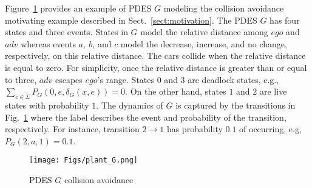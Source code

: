 \begin{example}  
Figure~\ref{fig:plant_G} provides an example of PDES $G$ modeling the collision avoidance motivating example described in Sect.~\ref{sect:motivation}.
The PDES $G$ has four states and three events.
States in $G$ model the relative distance among $ego$ and $adv$ whereas events $a,\ b$, and $c$ model the decrease, increase, and no change, respectively, on this relative distance.
The cars collide when the relative distance is equal to zero.
For simplicity, once the relative distance is greater than or equal to three, $adv$ escapes $ego$'s range.
States $0$ and $3$ are deadlock states, e.g., $\sum_{e\in \Sigma} P_G(0,e,\delta_G(x,e)) = 0$.
On the other hand, states $1$ and $2$ are live states with probability $1$.
The dynamics of $G$ is captured by the transitions in Fig.~\ref{fig:plant_G} where the label describes the event and probability of the transition, respectively.
For instance, transition $2\rightarrow 1$ has probability $0.1$ of occurring, e.g, $P_G(2,a,1) = 0.1$.
\end{example}

\begin{figure}[thpb]
\centering
\texttt{[image: Figs/plant\_G.png]}
\caption{PDES $G$ collision avoidance}
\label{fig:plant_G}
\vspace{-2em}
\end{figure}

